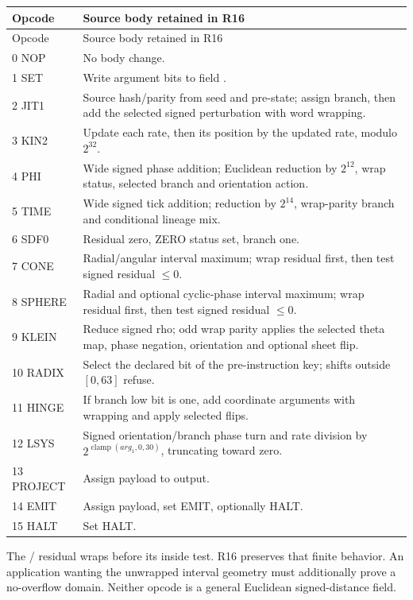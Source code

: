 {\small
\begin{longtable}{@{}P{.19\textwidth}P{.77\textwidth}@{}}
\toprule
Opcode & Source body retained in R16 \\
\midrule
\endfirsthead
\toprule Opcode & Source body retained in R16 \\
\midrule
{} NOP & No body change. \\
1 SET & Write argument bits to field . \\
2 JIT1 & Source hash/parity from seed and pre-state; assign branch, then add the selected signed perturbation with word wrapping. \\
3 KIN2 & Update each rate, then its position by the updated rate, modulo $2^{32}$. \\
4 PHI & Wide signed phase addition; Euclidean reduction by $2^{12}$, wrap status, selected branch and orientation action. \\
5 TIME & Wide signed tick addition; reduction by $2^{14}$, wrap-parity branch and conditional lineage mix. \\
6 SDF0 & Residual zero, ZERO status set, branch one. \\
7 CONE & Radial/angular interval maximum; wrap residual first, then test signed residual $\leq0$. \\
8 SPHERE & Radial and optional cyclic-phase interval maximum; wrap residual first, then test signed residual $\leq0$. \\
9 KLEIN & Reduce signed rho; odd wrap parity applies the selected theta map, phase negation, orientation and optional sheet flip. \\
10 RADIX & Select the declared bit of the pre-instruction key; shifts outside $[0,63]$ refuse. \\
11 HINGE & If branch low bit is one, add coordinate arguments with wrapping and apply selected flips. \\
12 LSYS & Signed orientation/branch phase turn and rate division by $2^{\operatorname{clamp}(arg_1,0,30)}$, truncating toward zero. \\
13 PROJECT & Assign payload to output. \\
14 EMIT & Assign payload, set EMIT, optionally HALT. \\
15 HALT & Set HALT. \\
\bottomrule
\end{longtable}}

The / residual wraps before its inside test.
R16 preserves that finite behavior. An application wanting the
unwrapped interval geometry must additionally prove a no-overflow
domain. Neither opcode is a general Euclidean signed-distance field.

